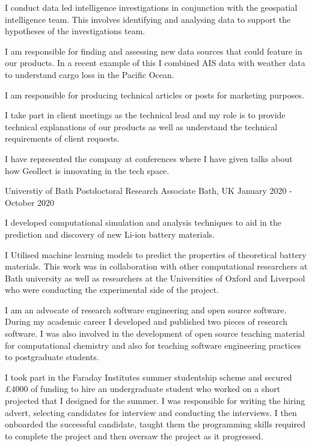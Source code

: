 \begin{cventries}
{\begin{cvitems}
        \item {I conduct data led intelligence investigations in conjunction with the geospatial intelligence team. This involves identifying and analysing data to support the hypotheses of the investigations team.}
        \item {I am responsible for finding and assessing new data sources that could feature in our products. In a recent example of this I combined AIS data with weather data to understand cargo loss in the Pacific Ocean.}
        \item {I am responsible for producing technical articles or posts for marketing purposes.}
        \item {I take part in client meetings as the technical lead and my role is to provide technical explanations of our products as well as understand the technical requirements of client requests.}
        \item {I have represented the company at conferences where I have given talks about how Geollect is innovating in the tech space.}
      \end{cvitems}
    }
  \cventry
    {Universtiy of Bath}
    {Postdoctoral Research Associate}
    {Bath, UK}
    {January 2020 - October 2020}
    {
      \begin{cvitems}
        \item {I developed computational simulation and analysis techniques to aid in the prediction and discovery of new Li-ion battery materials.}
        \item {I Utilised machine learning models to predict the properties of theoretical battery materials. This work was in collaboration with other computational researchers at Bath university as well as researchers at the Universities of Oxford and Liverpool who were conducting the experimental side of the project.}
        \item {I am an advocate of research software engineering and open source software. During my academic career I developed and published two pieces of research software. I was also involved in the development of open source teaching material for computational chemistry and also for teaching software engineering practices to postgraduate students.}
        \item {I took part in the Faraday Institutes summer studentship scheme and secured £4000 of funding to hire an undergraduate student who worked on a short projected that I designed for the summer. I was responsible for writing the hiring advert, selecting candidates for interview and conducting the interviews. I then onboarded the successful candidate, taught them the programming skills required to complete the project and then oversaw the project as it progressed.}

\end{cvitems}}
\end{cventries}
